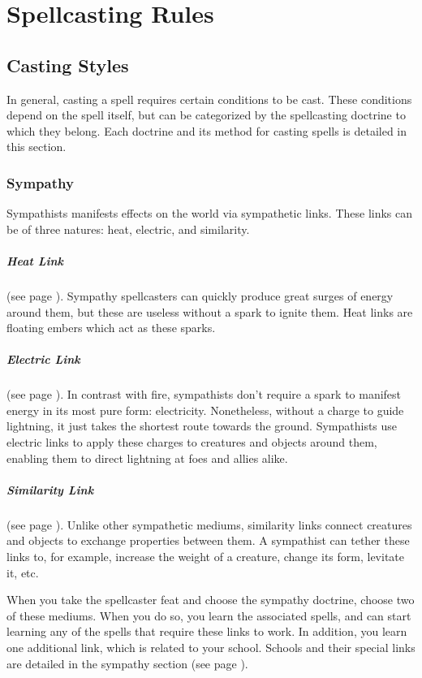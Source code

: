 \section{Spellcasting Rules} \label{sec::spellcastingrules}
\subsection*{Casting Styles}
    In general, casting a spell requires certain conditions to be cast.
    These conditions depend on the spell itself, but can be categorized by the spellcasting doctrine to which they belong.
    Each doctrine and its method for casting spells is detailed in this section.

    \subsubsection{Sympathy}
        Sympathists manifests effects on the world via sympathetic links.
        These links can be of three natures: heat, electric, and similarity.

        \subparagraph{Heat Link}
        (see page \pageref{spell::ember}).
        Sympathy spellcasters can quickly produce great surges of energy around them, but these are useless without a spark to ignite them.
        Heat links are floating embers which act as these sparks.

        \subparagraph{Electric Link}
        (see page \pageref{spell::charge}).
        In contrast with fire, sympathists don't require a spark to manifest energy in its most pure form: electricity.
        Nonetheless, without a charge to guide lightning, it just takes the shortest route towards the ground.
        Sympathists use electric links to apply these charges to creatures and objects around them, enabling them to direct lightning at foes and allies alike.

        \subparagraph{Similarity Link}
        (see page \pageref{spell::tether}).
        Unlike other sympathetic mediums, similarity links connect creatures and objects to exchange properties between them.
        A sympathist can tether these links to, for example, increase the weight of a creature, change its form, levitate it, etc.

        When you take the spellcaster feat and choose the sympathy doctrine, choose two of these mediums.
        When you do so, you learn the associated spells, and can start learning any of the spells that require these links to work.
        In addition, you learn one additional link, which is related to your school.
        Schools and their special links are detailed in the sympathy section (see page \pageref{sec::sympathy}).

